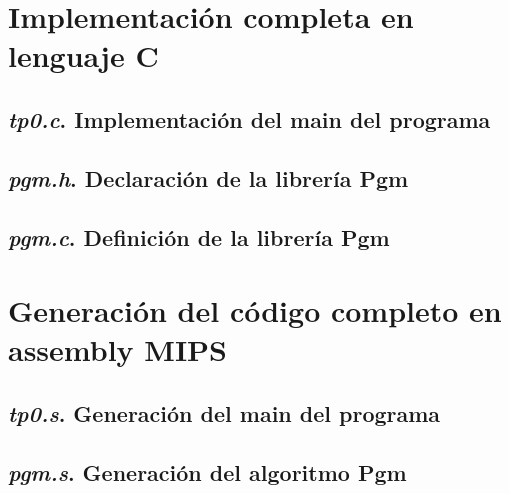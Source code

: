 \documentclass{article}
\begin{document}
\begin{appendices}

\bigskip\bigskip

\section{Implementación completa en lenguaje C}


\subsection{\textit{tp0.c}. Implementación del main del programa}
\lstset{ language = C } %
 
\bigskip\bigskip

\subsection{\textit{pgm.h}. Declaración de la librería Pgm}
\lstset{ language = C } %
 
\bigskip\bigskip

\subsection{\textit{pgm.c}. Definición de la librería Pgm}
\lstset{ language = C } %
 
\bigskip\bigskip



\section{Generación del código completo en assembly MIPS}


\subsection{\textit{tp0.s}. Generación del main del programa}
\lstset{ language = [mips]Assembler } %
 
\bigskip\bigskip

\subsection{\textit{pgm.s}. Generación del algoritmo Pgm}
\lstset{ language = [mips]Assembler} %
 
\bigskip\bigskip


\end{appendices}
\end{document}
